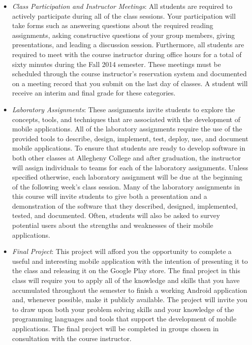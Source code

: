 \begin{itemize}

	\item {\em Class Participation and Instructor Meetings}: All students are required to actively participate during
		all of the class sessions. Your participation will take forms such as answering questions about the required
		reading assignments, asking constructive questions of your group members, giving presentations, and leading a
		discussion session. Furthermore, all students are required to meet with the course instructor during office
		hours for a total of sixty minutes during the Fall 2014 semester.  These meetings must be scheduled through the
		course instructor's reservation system and documented on a meeting record that you submit on the last day of
		classes. A student will receive an interim and final grade for these categories.

	\item {\em Laboratory Assignments}: These assignments invite students to explore the concepts, tools, and techniques
		that are associated with the development of mobile applications.  All of the laboratory assignments require the
		use of the provided tools to describe, design, implement, test, deploy, use, and document mobile applications.
		To ensure that students are ready to develop software in both other classes at Allegheny College and after
		graduation, the instructor will assign individuals to teams for each of the laboratory assignments.  Unless
		specified otherwise, each laboratory assignment will be due at the beginning of the following week's class
		session.  Many of the laboratory assignments in this course will invite students to give both a presentation and a
		demonstration of the software that they described, designed, implemented, tested, and documented. Often,
		students will also be asked to survey potential users about the strengths and weaknesses of their mobile
		applications.
	
        \item {\em Final Project}: This project will afford you the opportunity to complete a useful and interesting
          mobile application with the intention of presenting it to the class and releasing it on the Google Play store.
          The final project in this class will require you to apply all of the knowledge and skills that you have
          accumulated throughout the semester to finish a working Android application and, whenever possible, make it
          publicly available.  The project will invite you to draw upon both your problem solving skills and your
          knowledge of the programming languages and tools that support the development of mobile applications. The
          final project will be completed in groups chosen in consultation with the course instructor.
		
\end{itemize}

